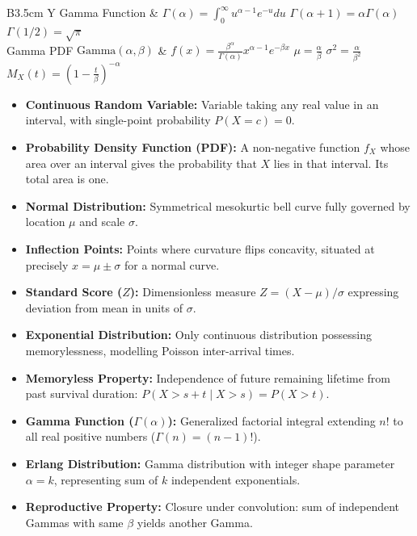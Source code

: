 \documentclass[12pt,a4paper]{article}
\begin{document}
\begin{tcolorbox}[formulabox, title={\textbf{Key Formulas and Continuous Distribution Densities at a Glance}}]
\begin{tabularx}{\linewidth}{B{3.5cm} Y}
Gamma Function & $\Gamma(\alpha) = \int_0^\infty u^{\alpha-1} e^{-u} du$ \newline $\Gamma(\alpha+1) = \alpha \Gamma(\alpha)$ \newline $\Gamma(1/2) = \sqrt{\pi}$ \\[3pt]
Gamma PDF $\text{Gamma}(\alpha, \beta)$ & $f(x) = \frac{\beta^\alpha}{\Gamma(\alpha)} x^{\alpha-1} e^{-\beta x}$ \newline $\mu = \frac{\alpha}{\beta}$ \newline $\sigma^2 = \frac{\alpha}{\beta^2}$ \newline $M_X(t) = \left(1-\frac{t}{\beta}\right)^{-\alpha}$ \\[3pt]
\end{tabularx}\par
\end{tcolorbox}

\vspace{1pt}

\begin{tcolorbox}[defbox, title={\textbf{One-Line Definitions}}]
\begin{itemize}[leftmargin=*, itemsep=2pt, topsep=0pt, parsep=0pt]
  \item \textbf{Continuous Random Variable:} Variable taking any real value in an interval, with single-point probability $P(X=c)=0$.
  \item \textbf{Probability Density Function (PDF):} A non-negative function $f_X$ whose area over an interval gives the probability that $X$ lies in that interval. Its total area is one.
  \item \textbf{Normal Distribution:} Symmetrical mesokurtic bell curve fully governed by location $\mu$ and scale $\sigma$.
  \item \textbf{Inflection Points:} Points where curvature flips concavity, situated at precisely $x = \mu \pm \sigma$ for a normal curve.
  \item \textbf{Standard Score ($Z$):} Dimensionless measure $Z = (X-\mu)/\sigma$ expressing deviation from mean in units of $\sigma$.
  \item \textbf{Exponential Distribution:} Only continuous distribution possessing memorylessness, modelling Poisson inter-arrival times.
  \item \textbf{Memoryless Property:} Independence of future remaining lifetime from past survival duration: $P(X>s+t \mid X>s) = P(X>t)$.
  \item \textbf{Gamma Function ($\Gamma(\alpha)$):} Generalized factorial integral extending $n!$ to all real positive numbers ($\Gamma(n) = (n-1)!$).
  \item \textbf{Erlang Distribution:} Gamma distribution with integer shape parameter $\alpha = k$, representing sum of $k$ independent exponentials.
  \item \textbf{Reproductive Property:} Closure under convolution: sum of independent Gammas with same $\beta$ yields another Gamma.
\end{itemize}
\end{tcolorbox}
\end{document}
